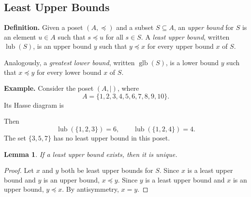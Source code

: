 \documentclass{article}
\newtheorem*{lemma}{Lemma}
\begin{document}
\subsection*{Least Upper Bounds}

\textbf{Definition.} Given a poset $(A, \preceq)$ and a subset $S \subseteq A$, an \textit{upper bound} for $S$ is an element $u \in A$ such that $s \preceq u$ for all $s \in S$. A \textit{least upper bound}, written $\operatorname{lub}(S)$, is an upper bound $y$ such that $y \preceq x$ for every upper bound $x$ of $S$.

Analogously, a \textit{greatest lower bound}, written $\operatorname{glb}(S)$, is a lower bound $y$ such that $x \preceq y$ for every lower bound $x$ of $S$.

\textbf{Example.} Consider the poset $(A, \mid)$, where
\[
A = \{1,2,3,4,5,6,7,8,9,10\}.
\]
Its Hasse diagram is
\begin{center}
\end{center}
Then
\[
\operatorname{lub}(\{1,2,3\}) = 6,\qquad \operatorname{lub}(\{1,2,4\}) = 4.
\]
The set $\{3,5,7\}$ has no least upper bound in this poset.

\begin{lemma}
If a least upper bound exists, then it is unique.
\end{lemma}

\begin{proof}
Let $x$ and $y$ both be least upper bounds for $S$. Since $x$ is a least upper bound and $y$ is an upper bound, $x \preceq y$. Since $y$ is a least upper bound and $x$ is an upper bound, $y \preceq x$. By antisymmetry, $x = y$.
\end{proof}
\end{document}
